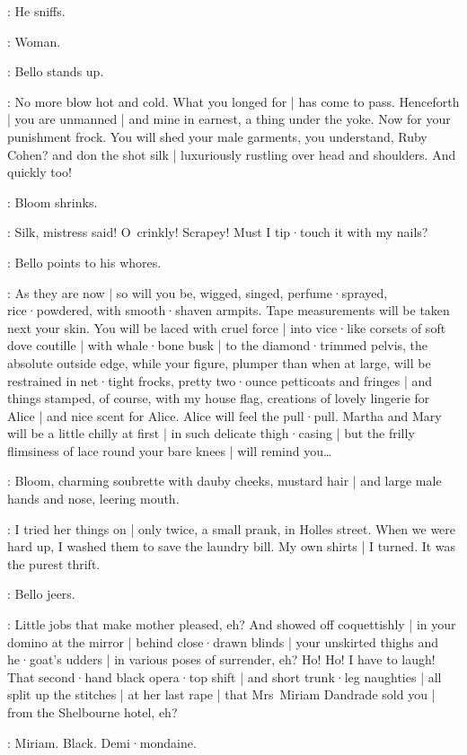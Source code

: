 :
He sniffs.

\Bloom:
Woman.

:
Bello stands up.

\Bello:
No more blow hot and cold.
What you longed for |
has come to pass.
Henceforth |
you are unmanned |
and mine in earnest,
a thing under the yoke.
Now for your punishment frock.
You will shed your male garments,
you understand,
Ruby Cohen?
and don the shot silk |
luxuriously rustling over head and shoulders.
And quickly too!

:
Bloom shrinks.

\Bloom:
Silk,
mistress said!
O~crinkly!
Scrapey!
Must I tip·touch it with my nails?

:
Bello points to his whores.

\Bello:
As they are now |
so will you be,
wigged,
singed,
perfume·sprayed,
rice·powdered,
with smooth·shaven armpits.
Tape measurements will be taken next your skin.
You will be laced with cruel force |
into vice·like corsets of soft dove coutille |
with whale·bone busk |
to the diamond·trimmed pelvis,
the absolute outside edge,
while your figure,
plumper than when at large,
will be restrained in net·tight frocks,
pretty two·ounce petticoats and fringes |
and things stamped,
of course,
with my house flag,
%
creations of lovely lingerie for Alice |
and nice scent for Alice.
Alice will feel the pull·pull.
Martha and Mary will be a little chilly at first |
in such delicate thigh·casing |
but the frilly flimsiness of lace round your bare knees |
will remind you…

:
Bloom,
charming soubrette with dauby cheeks,
mustard hair |
and large male hands and nose,
leering mouth.

\Bloom:
I tried her things on |
only twice,
a small prank,
in Holles street.
When we were hard up,
I washed them to save the laundry bill.
My own shirts |
I turned.
It was the purest thrift.

:
Bello jeers.

\Bello:
Little jobs that make mother pleased,
eh?
%
And showed off coquettishly |
in your domino at the mirror |
behind close·drawn blinds |
your unskirted thighs and he·goat's udders |
in various poses of surrender,
eh?
Ho!
Ho!
I have to laugh!
That second·hand black opera·top shift |
and short trunk·leg naughties |
all split up the stitches |
at her last rape |
that Mrs~Miriam Dandrade sold you |
from the Shelbourne hotel,
eh?

\Bloom:
Miriam.
Black.
Demi·mondaine.

